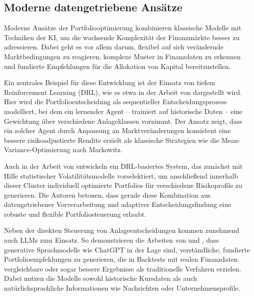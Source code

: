   \subsection{Moderne datengetriebene Ansätze}


    Moderne Ansätze der Portfoliooptimierung kombinieren klassische Modelle mit Techniken der \acs{KI}, um die wachsende Komplexität der Finanzmärkte besser zu adressieren.
    Dabei geht es vor allem darum, flexibel auf sich verändernde Marktbedingungen zu reagieren, komplexe Muster in Finanzdaten zu erkennen und fundierte Empfehlungen für die Allokation von Kapital bereitzustellen.

    Ein zentrales Beispiel für diese Entwicklung ist der Einsatz von tiefem Reinforcement Learning (\acs{DRL}), wie es etwa in der Arbeit von \textcite{sood2023} dargestellt wird.
    Hier wird die Portfolioentscheidung als sequentieller Entscheidungsprozess modelliert, bei dem ein lernender Agent -- trainiert auf historische Daten -- eine Gewichtung über verschiedene Anlageklassen vornimmt.
    Der Ansatz zeigt, dass ein solcher Agent durch Anpassung an Marktveränderungen konsistent eine bessere risikoadjustierte Rendite erzielt als klassische Strategien wie die Mean-Variance-Optimierung nach Markowitz.

    Auch in der Arbeit von \textcite{orra2025} entwickeln ein \acs{DRL}-basiertes System, das zunächst mit Hilfe statistischer Volatilitätsmodelle vorselektiert, um anschließend innerhalb dieser Cluster individuell optimierte Portfolios für verschiedene Risikoprofile zu generieren.
    Die Autoren betonen, dass gerade diese Kombination aus datengetriebener Vorverarbeitung und adaptiver Entscheidungsfindung eine robuste und flexible Portfoliosteuerung erlaubt.

    Neben der direkten Steuerung von Anlageentscheidungen kommen zunehmend auch \acs{LLM}s zum Einsatz.
    So demonstrieren die Arbeiten von \textcite{lu2023} und \textcite{ko2023}, dass generative Sprachmodelle wie ChatGPT in der Lage sind, verständliche, fundierte Portfolioempfehlungen zu generieren, die in Backtests mit realen Finanzdaten vergleichbare oder sogar bessere Ergebnisse als traditionelle Verfahren erzielen.
    Dabei nutzen die Modelle sowohl historische Kursdaten als auch natürlichsprachliche Informationen wie Nachrichten oder Unternehmensprofile.

